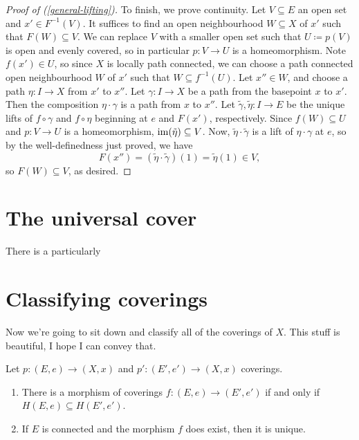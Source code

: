 \begin{proof}[Proof of (\ref{general-lifting})]
  To finish, we prove continuity. Let $V \subseteq E$ an open set and
  $x' \in F^{-1}(V)$. It suffices to find an open neighbourhood $W
  \subseteq X$ of $x'$ such that $F(W) \subseteq V$. We can replace
  $V$ with a smaller open set such that $U \coloneqq p(V)$ is open and
  evenly covered, so in particular $p : V \to U$ is a
  homeomorphism. Note $f(x') \in U$, so since $X$ is locally path
  connected, we can choose a path connected open neighbourhood $W$ of
  $x'$ such that $W \subseteq f^{-1}(U)$. Let $x'' \in W$, and choose
  a path $\eta : I \to X$ from $x'$ to $x''$. Let $\gamma : I \to X$
  be a path from the basepoint $x$ to $x'$. Then the composition $\eta
  \cdot \gamma$ is a path from $x$ to $x''$. Let $\tilde\gamma,
  \tilde\eta : I \to E$ be the unique lifts of $f \circ \gamma$ and $f
  \circ \eta$ beginning at $e$ and $F(x')$, respectively. Since $f(W)
  \subseteq U$ and $p : V \to U$ is a homeomorphism, $\operatorname{im}(\tilde\eta)
  \subseteq V$. Now, $\tilde\eta \cdot \tilde\gamma$ is a lift of
  $\eta \cdot \gamma$ at $e$, so by the well-definedness just proved,
  we have
  \[
  F(x'') = (\tilde\eta \cdot \tilde\gamma)(1) = \tilde\eta(1) \in V,
  \]
  so $F(W) \subseteq V$, as desired.
\end{proof}


\section{The universal cover}

There is a particularly


\section{Classifying coverings}

Now we're going to sit down and classify all of the coverings of
$X$. This stuff is beautiful, I hope I can convey that.

\begin{lemma}
  Let $p : (E,e) \to (X,x)$ and $p' : (E',e') \to (X,x)$
  coverings.
  \begin{enumerate}
  \item There is a morphism of coverings $f : (E,e) \to (E',e')$
    if and only if $H(E,e) \subseteq H(E',e')$.
  \item If $E$ is connected and the morphism $f$ does exist, then it
    is unique.
  \end{enumerate}
\end{lemma}

